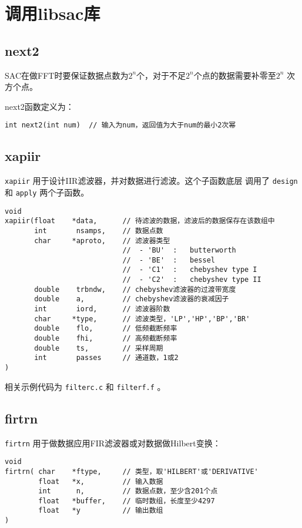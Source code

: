 \section{调用libsac库}
\label{sec:libsac}
\subsection{next2}
SAC在做FFT时要保证数据点数为$2^n$个，对于不足$2^n$个点的数据需要补零至$2^n$
次方个点。

next2函数定义为：
\begin{verbatim}
int next2(int num)  // 输入为num，返回值为大于num的最小2次幂
\end{verbatim}

\subsection{xapiir}
\texttt{xapiir} 用于设计IIR滤波器，并对数据进行滤波。这个子函数底层
调用了 \texttt{design} 和 \texttt{apply} 两个子函数。
\begin{verbatim}
void
xapiir(float    *data,      // 待滤波的数据，滤波后的数据保存在该数组中
       int       nsamps,    // 数据点数
       char     *aproto,    // 滤波器类型
                            //  - 'BU'  :   butterworth
                            //  - 'BE'  :   bessel
                            //  - 'C1'  :   chebyshev type I
                            //  - 'C2'  :   chebyshev type II
       double    trbndw,    // chebyshev滤波器的过渡带宽度
       double    a,         // chebyshev滤波器的衰减因子
       int       iord,      // 滤波器阶数
       char     *type,      // 滤波类型，'LP','HP','BP','BR'
       double    flo,       // 低频截断频率
       double    fhi,       // 高频截断频率
       double    ts,        // 采样周期
       int       passes     // 通道数，1或2
)
\end{verbatim}

相关示例代码为 \texttt{filterc.c} 和 \texttt{filterf.f} 。

\subsection{firtrn}
\texttt{firtrn} 用于做数据应用FIR滤波器或对数据做Hilbert变换：
\begin{verbatim}
void
firtrn( char    *ftype,     // 类型，取'HILBERT'或'DERIVATIVE'
        float   *x,         // 输入数据
        int      n,         // 数据点数，至少含201个点
        float   *buffer,    // 临时数组，长度至少4297
        float   *y          // 输出数组
)
\end{verbatim}

